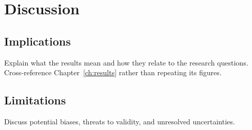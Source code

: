 \chapter{Discussion}
\label{ch:discussion}

\section{Implications}

Explain what the results mean and how they relate to the research questions.
Cross-reference Chapter~\ref{ch:results} rather than repeating its figures.

\section{Limitations}

Discuss potential biases, threats to validity, and unresolved uncertainties.
